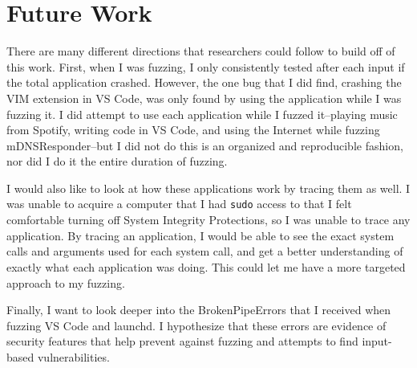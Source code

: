 \chapter{Future Work}
\label{sec:futureWork}
There are many different directions that researchers could follow to build off of this work.  First, when I was fuzzing, I only consistently tested after each input if the total application crashed.  However, the one bug that I did find, crashing the VIM extension in VS Code, was only found by using the application while I was fuzzing it.  I did attempt to use each application while I fuzzed it--playing music from Spotify, writing code in VS Code, and using the Internet while fuzzing mDNSResponder--but I did not do this is an organized and reproducible fashion, nor did I do it the entire duration of fuzzing.

I would also like to look at how these applications work by tracing them as well.  I was unable to acquire a computer that I had \texttt{sudo} access to that I felt comfortable turning off System Integrity Protections, so I was unable to trace any application.  By tracing an application, I would be able to see the exact system calls and arguments used for each system call, and get a better understanding of exactly what each application was doing.  This could let me have a more targeted approach to my fuzzing.

Finally, I want to look deeper into the BrokenPipeErrors that I received when fuzzing VS Code and launchd.  I hypothesize that these errors are evidence of security features that help prevent against fuzzing and attempts to find input-based vulnerabilities.
